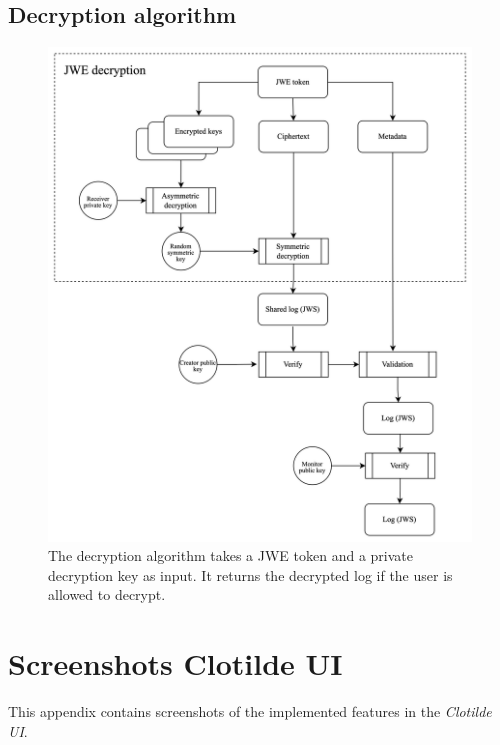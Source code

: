 \documentclass[../main.tex]{subfiles}
\begin{document}
\section{Decryption algorithm}
\label{app:decryption}
\begin{figure}[h]
    \includegraphics[scale=0.13]{../img/05/decrypt_logs.jpg}
    \centering
    \caption[Decryption algorithm]{The decryption algorithm takes a JWE token and a private decryption key as input. It returns the decrypted log if the user is allowed to decrypt.}
    \label{app:decryption_algo}
\end{figure}

\chapter{Screenshots Clotilde UI}

This appendix contains screenshots of the implemented features in the \emph{Clotilde UI}.
\end{document}
